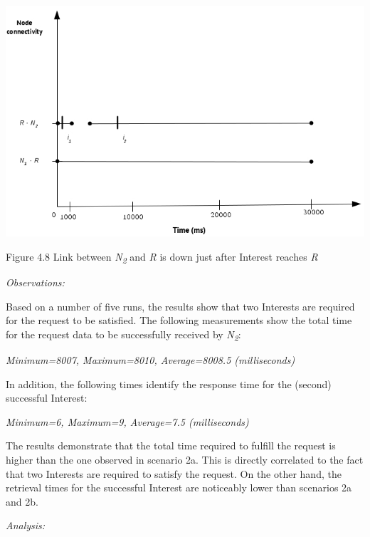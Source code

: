 \documentclass[a4paper,12pt]{report}      %
\begin{document}
\noindent\includegraphics[scale=0.55]{exp2c_timediag.jpg}\newline
\begin{center}Figure 4.8 Link between \emph{N\textsubscript{2}} and \emph{R} is down just after Interest reaches \emph{R}\end{center}

\vspace*{1\baselineskip}\noindent\emph{Observations:}

Based on a number of five runs, the results show that two Interests are required for the request to be
satisfied. The following measurements show the total time for the request data to be successfully
received by \emph{N\textsubscript{2}}:

\begin{center}\textsl{Minimum=8007, Maximum=8010, Average=8008.5 (milliseconds)}\end{center}

In addition, the following times identify the response time for the (second) successful Interest:

\begin{center}\textsl{Minimum=6, Maximum=9, Average=7.5 (milliseconds)}\end{center}

The results demonstrate that the total time required to fulfill the request is higher than the one observed in scenario 2a. 
This is directly correlated to the fact that two Interests are required to satisfy the request. 
On the other hand, the retrieval times for the successful Interest are noticeably lower than scenarios 2a
and 2b. 

\vspace*{1\baselineskip}\noindent\emph{Analysis:}
\end{document}
